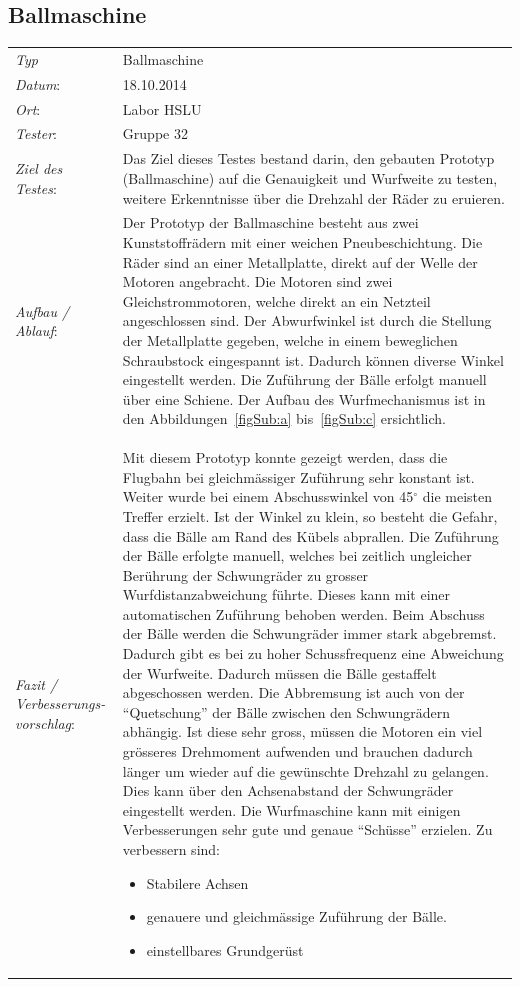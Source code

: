 \subsection{Ballmaschine}
\begin{tabular}{p{3.6cm}p{\textwidth-3.6cm-0.7cm}}
\rule{0pt}{11pt}\textit{Typ}              & Ballmaschine \\ 
\rule{0pt}{11pt}\textit{Datum}:           & 18.10.2014   \\
\rule{0pt}{11pt}\textit{Ort}:             & Labor HSLU \\
\rule{0pt}{11pt}\textit{Tester}:          & Gruppe 32 \\
\rule{0pt}{11pt}\textit{Ziel des Testes}: & Das Ziel dieses Testes 
bestand darin, den gebauten Prototyp (Ballmaschine) auf die Genauigkeit 
und Wurfweite zu testen, weitere Erkenntnisse über die Drehzahl der Räder 
zu eruieren. \\
\rule{0pt}{11pt}\textit{Aufbau / Ablauf}: & 
Der Prototyp der Ballmaschine besteht aus zwei Kunststoffrädern mit einer weichen 
Pneubeschichtung. Die Räder sind an einer Metallplatte, direkt auf der 
Welle der Motoren angebracht. Die Motoren sind zwei Gleichstrommotoren, 
welche direkt an ein Netzteil angeschlossen sind. Der Abwurfwinkel ist durch die Stellung 
der Metallplatte gegeben, welche in einem beweglichen Schraubstock 
eingespannt ist. Dadurch können diverse Winkel eingestellt werden. 
Die Zuführung der Bälle erfolgt manuell über eine Schiene. Der Aufbau des Wurfmechanismus ist
in den Abbildungen~\ref{figSub:a} bis~\ref{figSub:c} ersichtlich.\\
\rule{0pt}{11pt}\textit{Fazit / Verbesserungs-\newline vorschlag}: & 
Mit diesem Prototyp konnte gezeigt werden, dass die Flugbahn bei gleichmässiger 
Zuführung sehr konstant ist. Weiter wurde bei einem Abschusswinkel von 45$^\circ$ 
die meisten Treffer erzielt. Ist der Winkel zu klein, so besteht die Gefahr, 
dass die Bälle am Rand des Kübels abprallen. Die Zuführung der Bälle erfolgte 
manuell, welches bei zeitlich ungleicher Berührung der Schwungräder zu grosser 
Wurfdistanzabweichung führte. Dieses kann mit einer automatischen Zuführung behoben 
werden. Beim Abschuss der Bälle werden die Schwungräder immer stark abgebremst. 
Dadurch gibt es bei zu hoher Schussfrequenz eine Abweichung der Wurfweite. Dadurch 
müssen die Bälle gestaffelt abgeschossen werden. Die Abbremsung ist auch von der 
\enquote{Quetschung} der Bälle zwischen den Schwungrädern abhängig. Ist diese sehr 
gross, müssen die Motoren ein viel grösseres Drehmoment aufwenden und brauchen 
dadurch länger um wieder auf die gewünschte Drehzahl zu gelangen. Dies kann über 
den Achsenabstand der Schwungräder eingestellt werden.\newline
%
Die Wurfmaschine kann mit einigen Verbesserungen sehr gute und genaue 
\enquote{Schüsse} erzielen. Zu verbessern sind:
\begin{itemize}
    \item Stabilere Achsen
    \item genauere und gleichmässige Zuführung der Bälle.
    \item einstellbares Grundgerüst
\end{itemize}
\end{tabular}
